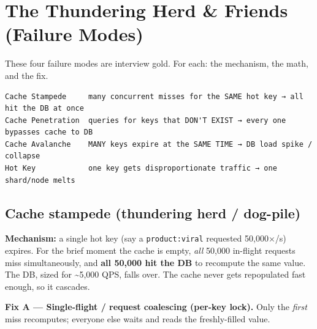 \documentclass[11pt]{article}
\begin{document}
\section{The Thundering Herd \& Friends (Failure Modes)}\label{the-thundering-herd--friends-failure-modes}

These four failure modes are interview gold. For each: the mechanism, the math, and the fix.

\setcodelang{}

\begin{verbatim}
Cache Stampede     many concurrent misses for the SAME hot key → all hit the DB at once
Cache Penetration  queries for keys that DON'T EXIST → every one bypasses cache to DB
Cache Avalanche    MANY keys expire at the SAME TIME → DB load spike / collapse
Hot Key            one key gets disproportionate traffic → one shard/node melts
\end{verbatim}

\subsection{Cache stampede (thundering herd / dog-pile)}\label{cache-stampede-thundering-herd--dog-pile}

\textbf{Mechanism:} a single hot key (say a \texttt{product:viral} requested 50,000\(\times\)/s) expires. For the brief moment the cache is empty, \emph{all} 50,000 in-flight requests miss simultaneously, and \textbf{all 50,000 hit the DB} to recompute the same value. The DB, sized for \textasciitilde5,000 QPS, falls over. The cache never gets repopulated fast enough, so it cascades.

\textbf{Fix A --- Single-flight / request coalescing (per-key lock).} Only the \emph{first} miss recomputes; everyone else waits and reads the freshly-filled value.

\end{document}

